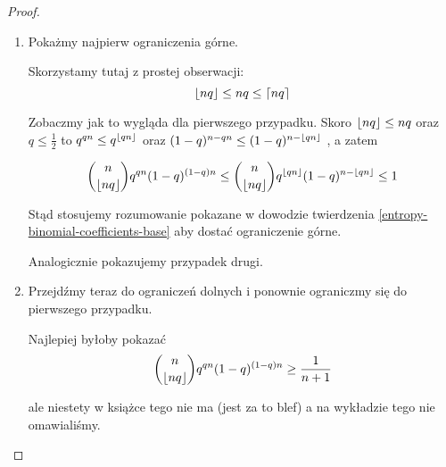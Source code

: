 \begin{proof}
	\begin{enumerate}
		\item Pokażmy najpierw ograniczenia górne.


		      Skorzystamy tutaj z prostej obserwacji:
		      \[
			      \left\lfloor nq\right\rfloor \leq nq \leq \left\lceil nq\right\rceil
		      \]

		      Zobaczmy jak to wygląda dla pierwszego przypadku.
		      Skoro \( \left\lfloor nq\right\rfloor \leq nq \) oraz \( q \leq \frac{1}{2} \) to
		      \( q^{qn} \leq q^{\left\lfloor qn\right\rfloor} \)
		      oraz
		      \( (1-q)^{n - qn} \leq (1-q)^{n - \left\lfloor qn\right\rfloor} \)
		      , a zatem

		      \[
			      \binom{n}{\left\lfloor nq\right\rfloor} q^{qn}(1-q)^{(1-q)n}
			      \leq \binom{n}{\left\lfloor nq\right\rfloor} q^{\left\lfloor qn\right\rfloor}(1-q)^{n - \left\lfloor qn\right\rfloor} \leq 1
		      \]

		      Stąd stosujemy rozumowanie pokazane w dowodzie twierdzenia \ref{entropy-binomial-coefficients-base} aby dostać ograniczenie górne.

		      Analogicznie pokazujemy przypadek drugi.


		\item Przejdźmy teraz do ograniczeń dolnych i ponownie ograniczmy się do pierwszego przypadku.

		      Najlepiej byłoby pokazać
		      \[
			      \binom{n}{\left\lfloor nq\right\rfloor}q^{qn}(1-q)^{(1-q)n} \geq \frac{1}{n+1}
		      \]

		      ale niestety w książce tego nie ma (jest za to blef) a na wykładzie tego nie omawialiśmy.
	\end{enumerate}
\end{proof}